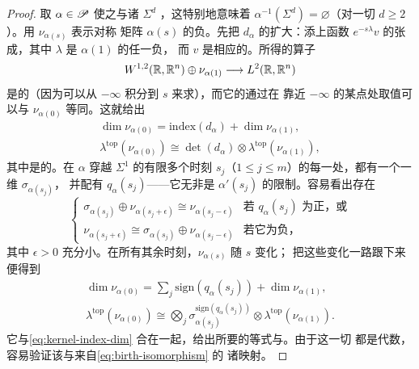\begin{proof}
取 $\alpha\in\mathscr{P}$ 使之与诸\trStratum{} $\Sigma^d$ \trTransverse，这特别地意味着
$\alpha^{-1}(\Sigma^d)=\varnothing$（对一切 $d\ge 2$）。用 $\nu_{\alpha(s)}$ 表示对称
矩阵 $\alpha(s)$ 的负\trEigenspace。先把 $d_{\alpha}$ 的\trDomain{}扩大：添上函数
$e^{-s\lambda}v$ 的\trLinear{}张成，其中 $\lambda$ 是 $\alpha(1)$ 的任一负\trEigenvalue，
而 $v$ 是相应的\trEigenvector。所得的算子
\begin{equation*}
W^{1,2}(\mathbb{R},\mathbb{R}^n)\oplus\nu_{\alpha(1)}\longrightarrow L^2(\mathbb{R},\mathbb{R}^n)
\end{equation*}
是\trSurjective{}的（因为可以从 $-\infty$ 积分到 $s$ 来求\trPreimage），而它的\trKernel{}通过在
靠近 $-\infty$ 的某点处取值可以与 $\nu_{\alpha(0)}$ 等同。这就给出
\begin{equation}\label{eq:kernel-index-dim}
\begin{gathered}
\dim\nu_{\alpha(0)}=\mathrm{index}(d_{\alpha})+\dim\nu_{\alpha(1)},\\
\lambda^{\mathrm{top}}(\nu_{\alpha(0)})\cong\det(d_{\alpha})\otimes
\lambda^{\mathrm{top}}(\nu_{\alpha(1)}),
\end{gathered}
\end{equation}
其中\trIsomorphism{}是\trCanonical{}的。在 $\alpha$ 穿越 $\Sigma^1$ 的有限多个时刻
$s_j$（$1\le j\le m$）的每一处，都有一个一维\trNullSpace{} $\sigma_{\alpha(s_j)}$，
并配有\trNondegenerate\trQuadraticForm{} $q_{\alpha}(s_j)$——它无非是 $\alpha'(s_j)$
的限制。容易看出存在\trIsomorphism
\begin{equation*}
\begin{cases}
\sigma_{\alpha(s_j)}\oplus\nu_{\alpha(s_j+\epsilon)}\cong\nu_{\alpha(s_j-\epsilon)}
  & \text{若 } q_{\alpha}(s_j)\text{ 为正，或}\\[2pt]
\nu_{\alpha(s_j+\epsilon)}\cong\sigma_{\alpha(s_j)}\oplus\nu_{\alpha(s_j-\epsilon)}
  & \text{若它为负，}
\end{cases}
\end{equation*}
其中 $\epsilon>0$ 充分小。在所有其余时刻，$\nu_{\alpha(s)}$ 随 $s$ \trSmooth{}变化；
把这些变化一路跟下来便得到
\begin{equation*}
\begin{gathered}
\dim\nu_{\alpha(0)}=\sum_j\mathrm{sign}(q_{\alpha}(s_j))+\dim\nu_{\alpha(1)},\\
\lambda^{\mathrm{top}}(\nu_{\alpha(0)})\cong\bigotimes_j
\sigma_{\alpha(s_j)}^{\mathrm{sign}(q_{\alpha}(s_j))}\otimes
\lambda^{\mathrm{top}}(\nu_{\alpha(1)}).
\end{gathered}
\end{equation*}
它与\eqref{eq:kernel-index-dim} 合在一起，给出所要的等式与\trIsomorphism。由于这一切
都是\trLinear{}代数，容易验证该\trIsomorphism{}与来自\eqref{eq:birth-isomorphism} 的
诸\trParallelTransport{}映射\trCompatible。
\end{proof}
